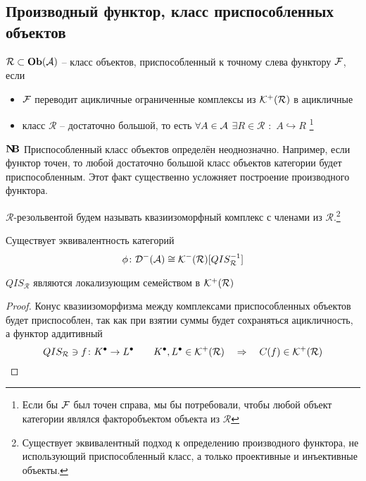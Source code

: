 \documentclass[../main.tex]{subfiles}
\begin{document}
\subsection{Производный функтор, класс приспособленных объектов}
\begin{to_def}
    $\mathcal{R} \subset \mathbf{Ob}(\mathcal{A})$ -- класс объектов, приспособленный к точному слева функтору $\mathcal{F}$, если 
    \begin{itemize}
        \item $\mathcal{F}$ переводит ацикличные ограниченные комплексы из $\mathcal{K^+(R)}$ в ацикличные
        \item класс $\mathcal{R}$ -- достаточно большой, то есть $\forall A \in \mathcal{A}$ $\exists R \in \mathcal{R}$ $\colon$ $A \hookrightarrow R$ \footnote{Если бы $\mathcal{F}$ был точен справа, мы бы потребовали, чтобы любой объект категории являлся факторобъектом объекта из $\mathcal{R}$}
    \end{itemize}
\end{to_def}
$\mathbf{N\kern-0.3em B}$ Приспособленный класс объектов определён неоднозначно. Например, если функтор точен, то любой достаточно большой класс объектов категории будет приспособленным. Этот факт существенно усложняет построение производного функтора.
\begin{to_def}
$\mathcal{R}$-резольвентой будем называть квазиизоморфный комплекс с членами из $\mathcal{R}$.\footnote{Существует эквивалентный подход к определению производного функтора, не использующий приспособленный класс, а только проективные и инъективные объекты.}
\end{to_def}
\begin{to_claim}
Существует эквивалентность категорий
\[\phi \colon \mathcal{D^-(A)} \cong \mathcal{K^-(R)}[QIS_{\mathcal{R}}^{-1}]\]
\end{to_claim}
\begin{to_claim}
 $QIS_{\mathcal{R}}$ являются локализующим семейством в $\mathcal{K^+(R)}$
\end{to_claim}
\begin{proof}
Конус квазиизоморфизма между комплексами приспособленных объектов будет приспособлен, так как при взятии суммы будет сохраняться ацикличность, а функтор аддитивный 
    \[QIS_{\mathcal{R}} \ni f\colon K^\bullet \to L^\bullet \qquad K^\bullet, L^\bullet \in \mathcal{K^+(R)} \quad \Rightarrow \quad C(f) \in \mathcal{K^+(R)}\]
\end{proof}
\end{document}
